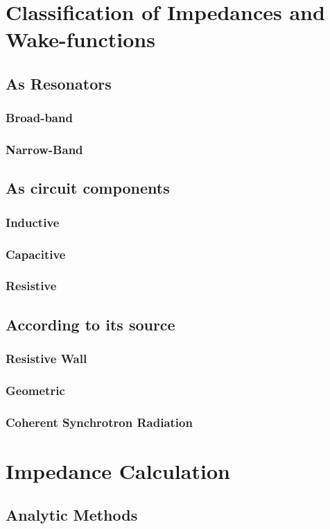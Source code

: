 \documentclass[
	12pt,				%
	openright,			%
	oneside,			%
	a4paper,		%
	chapter=TITLE,		%
	section=TITLE,		%
    brazil,				%
	english,			%
	sumario=tradicional,
	]{abntex2}
\begin{document}
  \section{Classification of Impedances and Wake-functions}
    \subsection{As Resonators}
      \subsubsection{Broad-band}
      \subsubsection{Narrow-Band}
    \subsection{As circuit components}
      \subsubsection{Inductive}
      \subsubsection{Capacitive}
      \subsubsection{Resistive}
    \subsection{According to its source}
      \subsubsection{Resistive Wall}
      \subsubsection{Geometric}
      \subsubsection{Coherent Synchrotron Radiation}
  \section{Impedance Calculation}
    \subsection{Analytic Methods}
\end{document}
